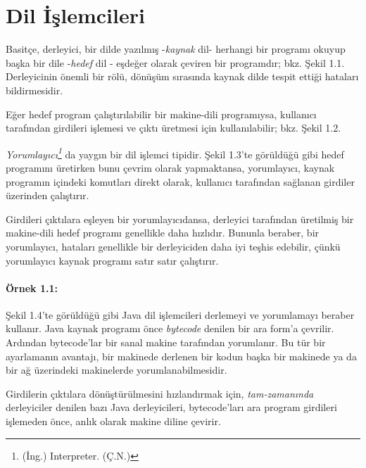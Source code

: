 \section{Dil İşlemcileri}

Basitçe, derleyici, bir dilde yazılmış -\textit{kaynak} dil- herhangi bir programı okuyup başka bir dile -\textit{hedef} dil -  eşdeğer olarak çeviren bir programdır; bkz. Şekil 1.1. Derleyicinin önemli bir rölü, dönüşüm sırasında kaynak dilde tespit ettiği hataları bildirmesidir.



Eğer hedef program çalıştırılabilir bir makine-dili programıysa, kullanıcı tarafından girdileri işlemesi ve çıktı üretmesi için kullanılabilir; bkz. Şekil 1.2.



\renewcommand{\thefootnote}{\fnsymbol{footnote}}
\textit{Yorumlayıcı\footnote{(İng.) Interpreter. (Ç.N.)}} da yaygın bir dil işlemci tipidir. Şekil 1.3'te görüldüğü gibi hedef programını üretirken bunu çevrim olarak yapmaktansa, yorumlayıcı, kaynak programın içindeki komutları direkt olarak, kullanıcı tarafından sağlanan girdiler üzerinden çalıştırır.



Girdileri çıktılara eşleyen bir yorumlayıcıdansa, derleyici tarafından üretilmiş bir makine-dili hedef programı genellikle daha hızlıdır. Bununla beraber, bir yorumlayıcı, hataları genellikle bir derleyiciden daha iyi teşhis edebilir, çünkü yorumlayıcı kaynak programı satır satır çalıştırır.

\paragraph{Örnek 1.1:}
Şekil 1.4'te görüldüğü gibi Java dil işlemcileri derlemeyi ve yorumlamayı beraber kullanır. Java kaynak programı önce \textit{bytecode} denilen bir ara form'a çevrilir. Ardından bytecode'lar bir sanal makine tarafından yorumlanır. Bu tür bir ayarlamanın avantajı, bir makinede derlenen bir kodun başka bir makinede ya da bir ağ üzerindeki makinelerde yorumlanabilmesidir.

Girdilerin çıktılara dönüştürülmesini hızlandırmak için, \textit{tam-zamanında} derleyiciler denilen bazı Java derleyicileri, bytecode'ları ara program girdileri işlemeden önce,  anlık olarak makine diline çevirir. 



